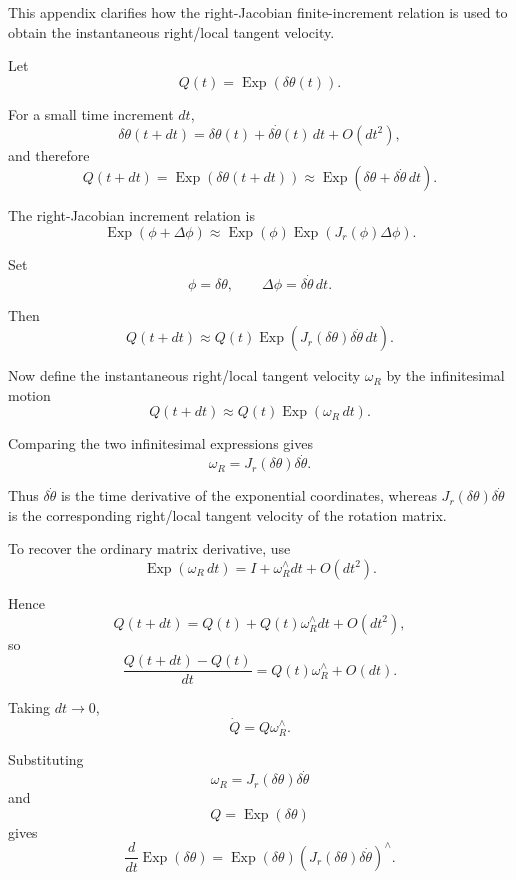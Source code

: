 \documentclass[11pt]{article}
\numberwithin{equation}{section}
\newcommand{\Exp}{\operatorname{Exp}}
\begin{document}
This appendix clarifies how the right-Jacobian finite-increment relation
is used to obtain the instantaneous right/local tangent velocity.

Let
\[
Q(t)=\Exp(\delta\theta(t)).
\]

For a small time increment $dt$,
\[
\delta\theta(t+dt)
=
\delta\theta(t)
+
\delta\dot\theta(t)\,dt
+
O(dt^2),
\]
and therefore
\[
Q(t+dt)
=
\Exp(\delta\theta(t+dt))
\approx
\Exp(\delta\theta+\delta\dot\theta\,dt).
\]

The right-Jacobian increment relation is
\begin{equation}
\boxed{
\Exp(\phi+\Delta\phi)
\approx
\Exp(\phi)
\Exp\!\left(J_r(\phi)\Delta\phi\right).
}
\end{equation}

Set
\[
\phi=\delta\theta,
\qquad
\Delta\phi=\delta\dot\theta\,dt.
\]

Then
\begin{equation}
\boxed{
Q(t+dt)
\approx
Q(t)
\Exp\!\left(
J_r(\delta\theta)\delta\dot\theta\,dt
\right).
}
\end{equation}

Now define the instantaneous right/local tangent velocity
$\omega_R$ by the infinitesimal motion
\begin{equation}
\boxed{
Q(t+dt)
\approx
Q(t)\Exp(\omega_R\,dt).
}
\end{equation}

Comparing the two infinitesimal expressions gives
\begin{equation}
\boxed{
\omega_R
=
J_r(\delta\theta)\delta\dot\theta.
}
\end{equation}

Thus $\delta\dot\theta$ is the time derivative of the exponential
coordinates, whereas $J_r(\delta\theta)\delta\dot\theta$ is the
corresponding right/local tangent velocity of the rotation matrix.

To recover the ordinary matrix derivative, use
\[
\Exp(\omega_R\,dt)
=
I+\omega_R^\wedge dt+O(dt^2).
\]

Hence
\[
Q(t+dt)
=
Q(t)
+
Q(t)\omega_R^\wedge dt
+
O(dt^2),
\]
so
\[
\frac{Q(t+dt)-Q(t)}{dt}
=
Q(t)\omega_R^\wedge
+
O(dt).
\]

Taking $dt\to0$,
\begin{equation}
\boxed{
\dot Q
=
Q\omega_R^\wedge.
}
\end{equation}

Substituting
\[
\omega_R
=
J_r(\delta\theta)\delta\dot\theta
\]
and
\[
Q=\Exp(\delta\theta)
\]
gives
\begin{equation}
\boxed{
\frac{d}{dt}\Exp(\delta\theta)
=
\Exp(\delta\theta)
\left(
J_r(\delta\theta)\delta\dot\theta
\right)^\wedge.
}
\end{equation}
\end{document}
